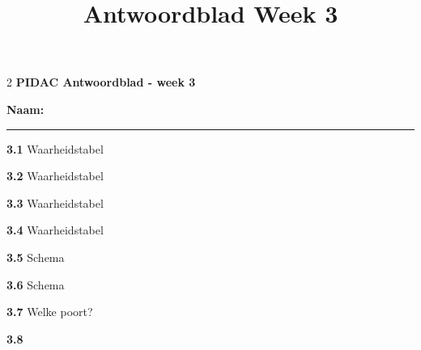 \documentclass[a4paper,12pt]{paper}
\title{Antwoordblad Week 3}
\date{}
\begin{document}
\begin{multicols}{2}
\textbf{\large PIDAC Antwoordblad - week 3}

\vspace{0.8cm}
\textbf{Naam:} \rule{12cm}{0.4pt}


\begin{tcolorbox}
\textbf{3.1} Waarheidstabel
\vspace{7cm}
\end{tcolorbox}


\begin{tcolorbox}
\textbf{3.2} Waarheidstabel
\vspace{8.2cm}
\end{tcolorbox}

\columnbreak

\begin{tcolorbox}
\textbf{3.3} Waarheidstabel
\vspace{18.5cm}
\end{tcolorbox}

\columnbreak

\begin{tcolorbox}
\textbf{3.4} Waarheidstabel
\vspace{18.5cm}
\end{tcolorbox}

\columnbreak

\begin{tcolorbox}
\textbf{3.5} Schema
\vspace{18.5cm}
\end{tcolorbox}

\begin{tcolorbox}
\textbf{3.6} Schema
\vspace{18.5cm}
\end{tcolorbox}



\begin{tcolorbox}
\textbf{3.7} Welke poort?
\end{tcolorbox}

\begin{tcolorbox}
\textbf{3.8} 
\vspace{17.2cm}
\end{tcolorbox}
\end{multicols}
\end{document}
